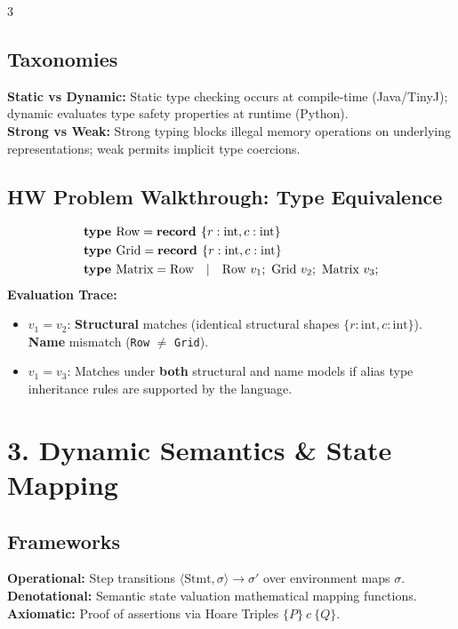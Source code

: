 \documentclass[8.5pt,landscape,a4paper]{article}
\begin{document}
\begin{multicols*}{3}
\subsection{Taxonomies}
\textbf{Static vs Dynamic:} Static type checking occurs at compile-time (Java/TinyJ); dynamic evaluates type safety properties at runtime (Python).\\
\textbf{Strong vs Weak:} Strong typing blocks illegal memory operations on underlying representations; weak permits implicit type coercions.

\subsection{HW Problem Walkthrough: Type Equivalence}
\begin{align*}
&\text{\bf type } \text{Row} = \text{\bf record } \{ r: \text{int}, c: \text{int} \}\\
&\text{\bf type } \text{Grid} = \text{\bf record } \{ r: \text{int}, c: \text{int} \}\\
&\text{\bf type } \text{Matrix} = \text{Row} \quad | \quad \text{Row } v_1; \,\, \text{Grid } v_2; \,\, \text{Matrix } v_3;
\end{align*}
\textbf{Evaluation Trace:}
\begin{itemize}
    \item $v_1 = v_2$: \textbf{Structural} matches (identical structural shapes $\{r:\text{int}, c:\text{int}\}$). \textbf{Name} mismatch (\texttt{Row} $\neq$ \texttt{Grid}).
    \item $v_1 = v_3$: Matches under \textbf{both} structural and name models if alias type inheritance rules are supported by the language.
\end{itemize}

\section{3. Dynamic Semantics \& State Mapping}
\subsection{Frameworks}
\textbf{Operational:} Step transitions $\langle \text{Stmt}, \sigma \rangle \rightarrow \sigma'$ over environment maps $\sigma$.\\
\textbf{Denotational:} Semantic state valuation mathematical mapping functions.\\
\textbf{Axiomatic:} Proof of assertions via Hoare Triples $\{P\}\ c\ \{Q\}$.


\end{multicols*}
\end{document}
